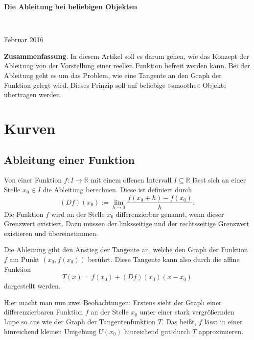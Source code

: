 \documentclass[a4paper,12pt,fleqn,dvipdfmx]{article}
\begin{document}
\begin{center}
\begin{LARGE}
\noindent
\textbf{Die Ableitung bei beliebigen Objekten}
\end{LARGE}
\\
\vspace{4mm}
\begin{large}
Februar 2016
\end{large}
\end{center}

\tableofcontents
\vspace{8mm}
\noindent
\textbf{Zusammenfassung}. In diesem Artikel soll es darum gehen,
wie das Konzept der Ableitung von der Vorstellung einer reellen
Funktion befreit werden kann. Bei der Ableitung geht es um das
Problem, wie eine Tangente an den Graph der Funktion gelegt wird.
Dieses Prinzip soll auf beliebige »smoothe« Objekte
übertragen werden.

\newpage
\section{Kurven}
\subsection{Ableitung einer Funktion}

Von einer Funktion $f\colon I\to\mathbb R$ mit einem
offenen Intervall $I\subseteq\mathbb R$ lässt sich an einer
Stelle $x_0\in I$ die Ableitung berechnen. Diese ist definiert
durch
\begin{equation}\label{eq:Differentialquotient}
(Df)(x_0) := \lim_{h\rightarrow 0} \frac{f(x_0+h)-f(x_0)}{h}.
\end{equation}
Die Funktion $f$ wird an der Stelle $x_0$ differenzierbar genannt,
wenn dieser Grenzwert existiert. Dazu müssen der linksseitige und
der rechtsseitige Grenzwert existieren und übereinstimmen.

Die Ableitung gibt den Anstieg der Tangente an, welche den Graph
der Funktion $f$ am Punkt $(x_0,f(x_0))$ berührt. Diese
Tangente kann also durch die affine Funktion
\begin{equation}
T(x) = f(x_0)+(Df)(x_0)(x-x_0)
\end{equation}
dargestellt werden.

Hier macht man nun zwei Beobachtungen: Erstens sieht der Graph einer
differenzierbaren Funktion $f$ an der Stelle $x_0$ unter einer
stark vergrößernden Lupe so aus wie der Graph der Tangentenfunktion
$T$. Das heißt, $f$ lässt in einer hinreichend kleinen
Umgebung $U(x_0)$ hinreichend gut durch $T$ approximieren.
\end{document}

